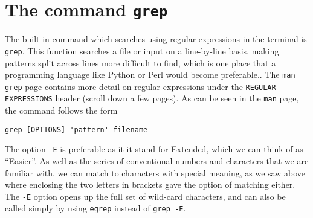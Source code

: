 \section{The command \texttt{grep}}
The built-in command which searches using regular expressions in the terminal is \texttt{grep}.
This function searches a file or input on a line-by-line basis, making patterns split across lines more difficult to find, which is one place that a programming language like Python or Perl would become preferable..  
The \texttt{man grep} page contains more detail on regular expressions under the \texttt{REGULAR EXPRESSIONS} header (scroll down a few pages).  
As can be seen in the \texttt{man} page, the command follows the form
\begin{lstlisting}[style=command_syntax]
grep [OPTIONS] 'pattern' filename
\end{lstlisting}
The option \texttt{-E} is preferable as it it stand for Extended, which we can think of as ``Easier''.
As well as the series of conventional numbers and characters that we are familiar with, we can match to characters with special meaning, as we saw above where enclosing the two letters in brackets gave the option of matching either. 
The \texttt{-E} option opens up the full set of wild-card characters, and can also be called simply by using \texttt{egrep} instead of \texttt{grep -E}.\\

